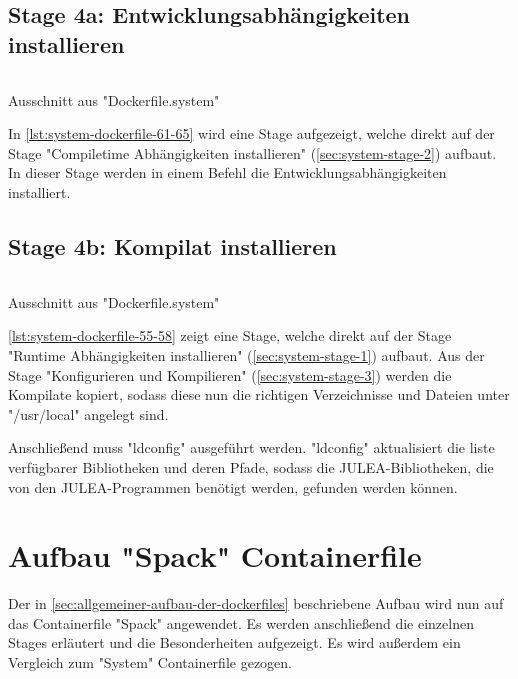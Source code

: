 \subsection{Stage 4a: Entwicklungsabhängigkeiten installieren} \label{sec:system-stage-4a}

\begin{listing}[H]
    \inputminted[firstline=61,lastline=65]{dockerfile}{./code-examples/Dockerfile.system}
    \caption{Ausschnitt aus "Dockerfile.system"}
    \label{lst:system-dockerfile-61-65}
\end{listing}

In \cref{lst:system-dockerfile-61-65} wird eine Stage aufgezeigt, welche direkt auf der Stage "Compiletime Abhängigkeiten installieren" (\cref{sec:system-stage-2}) aufbaut. In dieser Stage werden in einem Befehl die Entwicklungsabhängigkeiten installiert.

\subsection{Stage 4b: Kompilat installieren} \label{sec:system-stage-4b}

\begin{listing}[H]
    \inputminted[firstline=55,lastline=58]{dockerfile}{./code-examples/Dockerfile.system}
    \caption{Ausschnitt aus "Dockerfile.system"}
    \label{lst:system-dockerfile-55-58}
\end{listing}


\cref{lst:system-dockerfile-55-58} zeigt eine Stage, welche direkt auf der Stage "Runtime Abhängigkeiten installieren" (\cref{sec:system-stage-1}) aufbaut. Aus der Stage "Konfigurieren und Kompilieren" (\cref{sec:system-stage-3}) werden die Kompilate kopiert, sodass diese nun die richtigen Verzeichnisse und Dateien unter "/usr/local" angelegt sind.

Anschließend muss "ldconfig" ausgeführt werden. "ldconfig" aktualisiert die liste verfügbarer Bibliotheken und deren Pfade, sodass die JULEA-Bibliotheken, die von den JULEA-Programmen benötigt werden, gefunden werden können.

\pagebreak

\section{Aufbau "Spack" Containerfile}

Der in \cref{sec:allgemeiner-aufbau-der-dockerfiles} beschriebene Aufbau wird nun auf das Containerfile "Spack" angewendet. Es werden anschließend die einzelnen Stages erläutert und die Besonderheiten aufgezeigt. Es wird außerdem ein Vergleich zum "System" Containerfile gezogen.

